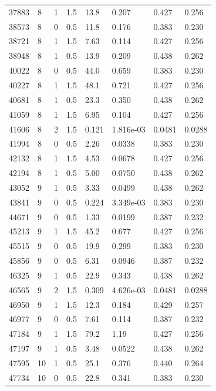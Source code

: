 \documentclass[preview]{standalone}
\begin{document}
{{{\begin{tabular}{L{1.2cm}C{1.2cm} C{0.3cm}C{0.5cm} C{1.4cm}C{1.4cm} C{1.4cm}C{1.4cm}}
  37883  &     8  & 1     & 1.5 &  13.8  & 0.207  & 0.427 &  0.256   \\ 
  38573  &     8  & 0     & 0.5 &  11.8  & 0.176  & 0.383 &  0.230   \\ 
  38721  &     8  & 1     & 1.5 &  7.63  & 0.114  & 0.427 &  0.256   \\ 
  38948  &     8  & 1     & 0.5 &  13.9  & 0.209  & 0.438 &  0.262   \\ 
  40022  &     8  & 0     & 0.5 &  44.0  & 0.659  & 0.383 &  0.230   \\ 
  40227  &     8  & 1     & 1.5 &  48.1  & 0.721  & 0.427 &  0.256   \\ 
  40681  &     8  & 1     & 0.5 &  23.3  & 0.350  & 0.438 &  0.262   \\ 
  41059  &     8  & 1     & 1.5 &  6.95  & 0.104  & 0.427 &  0.256   \\ 
  41606  &     8  & 2     & 1.5 &  0.121  & 1.816e-03  & 0.0481 &  0.0288   \\ 
  41994  &     8  & 0     & 0.5 &  2.26  & 0.0338  & 0.383 &  0.230   \\ 
  42132  &     8  & 1     & 1.5 &  4.53  & 0.0678  & 0.427 &  0.256   \\ 
  42194  &     8  & 1     & 0.5 &  5.00  & 0.0750  & 0.438 &  0.262   \\ 
  43052  &     9  & 1     & 0.5 &  3.33  & 0.0499  & 0.438 &  0.262   \\ 
  43841  &     9  & 0     & 0.5 &  0.224  & 3.349e-03  & 0.383 &  0.230   \\ 
  44671  &     9  & 0     & 0.5 &  1.33  & 0.0199  & 0.387 &  0.232   \\ 
  45213  &     9  & 1     & 1.5 &  45.2  & 0.677  & 0.427 &  0.256   \\ 
  45515  &     9  & 0     & 0.5 &  19.9  & 0.299  & 0.383 &  0.230   \\ 
  45856  &     9  & 0     & 0.5 &  6.31  & 0.0946  & 0.387 &  0.232   \\ 
  46325  &     9  & 1     & 0.5 &  22.9  & 0.343  & 0.438 &  0.262   \\ 
  46565  &     9  & 2     & 1.5 &  0.309  & 4.626e-03  & 0.0481 &  0.0288   \\ 
  46950  &     9  & 1     & 1.5 &  12.3  & 0.184  & 0.429 &  0.257   \\ 
  46977  &     9  & 0     & 0.5 &  7.61  & 0.114  & 0.387 &  0.232   \\ 
  47184  &     9  & 1     & 1.5 &  79.2  & 1.19  & 0.427 &  0.256   \\ 
  47197  &     9  & 1     & 0.5 &  3.48  & 0.0522  & 0.438 &  0.262   \\ 
  47595  &    10  & 1     & 0.5 &  25.1  & 0.376  & 0.440 &  0.264   \\ 
  47734  &    10  & 0     & 0.5 &  22.8  & 0.341  & 0.383 &  0.230   \\ 
\hline 
\end{tabular} 

}}}
\end{document}
